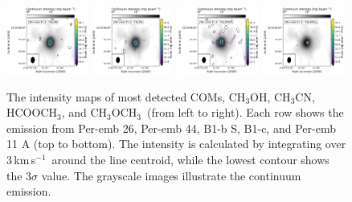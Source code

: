 \documentclass[twocolumn]{aastex62}
\newcommand{\kms}{\mbox{\,km\,s$^{-1}$}}
\newcommand{\methylformate}{\mbox{HCOOCH$_{3}$}}
\newcommand{\methanol}{\mbox{CH$_{3}$OH}}
\newcommand{\dimethylether}{\mbox{CH$_{3}$OCH$_{3}$}}
\newcommand{\methylcyanide}{\mbox{CH$_{3}$CN}}
\begin{document}
\begin{figure}[htbp!]
  \includegraphics[width=0.24\textwidth]{Set3_ID07_CH3OH_243915.pdf}
  \includegraphics[width=0.24\textwidth]{Set3_ID07_CH3CN_257527.pdf}
  \includegraphics[width=0.24\textwidth]{Set3_ID07_CH3OCHO_259342.pdf}
  \includegraphics[width=0.24\textwidth]{Set3_ID07_CH3OCH3_259311.pdf}

  \caption{The intensity maps of most detected COMs, \methanol, \methylcyanide, \methylformate, and \dimethylether\ (from left to right).  Each row shows the emission from Per-emb 26, Per-emb 44, B1-b S, B1-c, and Per-emb 11 A (top to bottom).  The intensity is calculated by integrating over 3\kms\ around the line centroid, while the lowest contour shows the 3$\sigma$ value.  The grayscale images illustrate the continuum emission.}
  \label{fig:coms_map_sample}
\end{figure}
\end{document}
